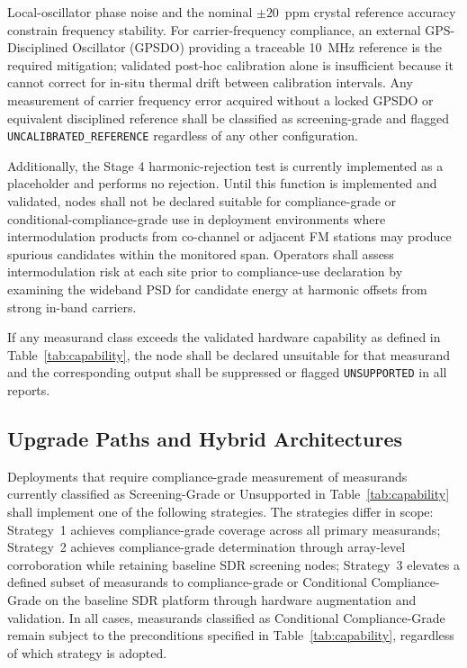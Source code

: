 \documentclass[11pt]{article}
\begin{document}
\begin{description}
\end{description}

Local-oscillator phase noise and the nominal $\pm 20$~ppm crystal reference accuracy constrain frequency stability. For carrier-frequency compliance, an external GPS-Disciplined Oscillator (GPSDO) providing a traceable 10~MHz reference is the required mitigation; validated post-hoc calibration alone is insufficient because it cannot correct for in-situ thermal drift between calibration intervals. Any measurement of carrier frequency error acquired without a locked GPSDO or equivalent disciplined reference shall be classified as screening-grade and flagged \texttt{UNCALIBRATED\_REFERENCE} regardless of any other configuration.

Additionally, the Stage 4 harmonic-rejection test is currently implemented as a placeholder and performs no rejection. Until this function is implemented and validated, nodes shall not be declared suitable for compliance-grade or conditional-compliance-grade use in deployment environments where intermodulation products from co-channel or adjacent FM stations may produce spurious candidates within the monitored span. Operators shall assess intermodulation risk at each site prior to compliance-use declaration by examining the wideband PSD for candidate energy at harmonic offsets from strong in-band carriers.

If any measurand class exceeds the validated hardware capability as defined in Table~\ref{tab:capability}, the node shall be declared unsuitable for that measurand and the corresponding output shall be suppressed or flagged \texttt{UNSUPPORTED} in all reports.

\subsection*{Upgrade Paths and Hybrid Architectures}

Deployments that require compliance-grade measurement of measurands currently classified as Screening-Grade or Unsupported in Table~\ref{tab:capability} shall implement one of the following strategies. The strategies differ in scope: Strategy~1 achieves compliance-grade coverage across all primary measurands; Strategy~2 achieves compliance-grade determination through array-level corroboration while retaining baseline SDR screening nodes; Strategy~3 elevates a defined subset of measurands to compliance-grade or Conditional Compliance-Grade on the baseline SDR platform through hardware augmentation and validation. In all cases, measurands classified as Conditional Compliance-Grade remain subject to the preconditions specified in Table~\ref{tab:capability}, regardless of which strategy is adopted.
\end{document}
